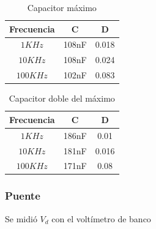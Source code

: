 \documentclass[../../main.tex]{subfiles}
\begin{document}
\begin{table}[H]
\begin{center}
\begin{tabular}{|c|c|c|}
\hline
 Frecuencia&C&D\\
\hline \hline

$ 1KHz$ &108nF&0.018  \\ \hline
$ 10KHz$  & 108nF&0.024  \\ \hline
$ 100KHz$  &102nF &0.083  \\ \hline

\end{tabular}
\caption{Capacitor m\'aximo } 
\end{center}
\end{table}

\begin{table}[H]
\begin{center}
\begin{tabular}{|c|c|c|}
\hline
 Frecuencia&C&D\\
\hline \hline

$ 1KHz$ &186nF&0.01  \\ \hline
$ 10KHz$  & 181nF&0.016  \\ \hline
$ 100KHz$  &171nF &0.08  \\ \hline

\end{tabular}
\caption{Capacitor doble del m\'aximo } 
\end{center}
\end{table}



\subsubsection{Puente}
Se midió $V_d$ con el volt\'imetro de banco
\end{document}

